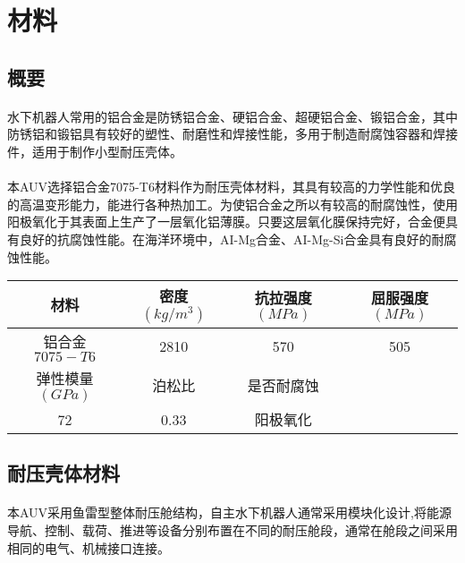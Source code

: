 \documentclass{ctexart}
\begin{document}
    \section{材料}
    \subsection{概要}
    \paragraph{}水下机器人常用的铝合金是防锈铝合金、硬铝合金、超硬铝合金、锻铝合金，其中防锈铝和锻铝具有较好的塑性、耐磨性和焊接性能，多用于制造耐腐蚀容器和焊接件，适用于制作小型耐压壳体。
    \paragraph{}本AUV选择铝合金7075-T6材料作为耐压壳体材料，其具有较高的力学性能和优良的高温变形能力，能进行各种热加工。为使铝合金之所以有较高的耐腐蚀性，使用阳极氧化于其表面上生产了一层氧化铝薄膜。只要这层氧化膜保持完好，合金便具有良好的抗腐蚀性能。在海洋环境中，AI-Mg合金、AI-Mg-Si合金具有良好的耐腐蚀性能。 \\
    \begin{tabular}{|c|c|c|c|}
    \hline
    材料 & 密度$(kg/m^3)$ & 抗拉强度$(MPa)$ & 屈服强度$(MPa)$ \\ 
    \hline
    铝合金$7075-T6$ & 2810 & 570 & 505 \\
    \hline
    弹性模量$(GPa)$ & 泊松比 & 是否耐腐蚀 & \\
    \hline
    72 & 0.33 & 阳极氧化 & \\
    \hline
    \end{tabular}

    \subsection{耐压壳体材料}
    \paragraph{}本AUV采用鱼雷型整体耐压舱结构，自主水下机器人通常采用模块化设计,将能源导航、控制、载荷、推进等设备分别布置在不同的耐压舱段，通常在舱段之间采用相同的电气、机械接口连接。
\end{document}
